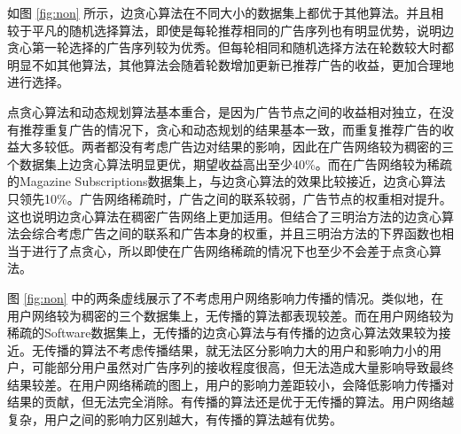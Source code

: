 如图 \ref{fig:non} 所示，边贪心算法在不同大小的数据集上都优于其他算法。并且相较于平凡的随机选择算法，即使是每轮推荐相同的广告序列也有明显优势，说明边贪心第一轮选择的广告序列较为优秀。但每轮相同和随机选择方法在轮数较大时都明显不如其他算法，其他算法会随着轮数增加更新已推荐广告的收益，更加合理地进行选择。

点贪心算法和动态规划算法基本重合，是因为广告节点之间的收益相对独立，在没有推荐重复广告的情况下，贪心和动态规划的结果基本一致，而重复推荐广告的收益大多较低。两者都没有考虑广告边对结果的影响，因此在广告网络较为稠密的三个数据集上边贪心算法明显更优，期望收益高出至少40\%。而在广告网络较为稀疏的Magazine Subscriptions数据集上，与边贪心算法的效果比较接近，边贪心算法只领先10\%。广告网络稀疏时，广告之间的联系较弱，广告节点的权重相对提升。这也说明边贪心算法在稠密广告网络上更加适用。但结合了三明治方法的边贪心算法会综合考虑广告之间的联系和广告本身的权重，并且三明治方法的下界函数也相当于进行了点贪心，所以即使在广告网络稀疏的情况下也至少不会差于点贪心算法。

图 \ref{fig:non} 中的两条虚线展示了不考虑用户网络影响力传播的情况。类似地，在用户网络较为稠密的三个数据集上，无传播的算法都表现较差。而在用户网络较为稀疏的Software数据集上，无传播的边贪心算法与有传播的边贪心算法效果较为接近。无传播的算法不考虑传播结果，就无法区分影响力大的用户和影响力小的用户，可能部分用户虽然对广告序列的接收程度很高，但无法造成大量影响导致最终结果较差。在用户网络稀疏的图上，用户的影响力差距较小，会降低影响力传播对结果的贡献，但无法完全消除。有传播的算法还是优于无传播的算法。用户网络越复杂，用户之间的影响力区别越大，有传播的算法越有优势。

